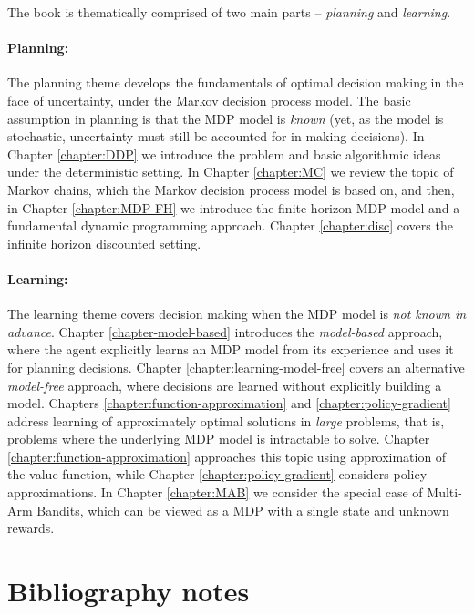 The book is thematically comprised of two main parts -- \textit{planning} and \textit{learning}. 

\paragraph{Planning:} The planning theme develops the fundamentals of optimal decision making in the face of uncertainty, under the Markov decision process model. The basic assumption in planning is that the MDP model is \textit{known} (yet, as the model is stochastic, uncertainty must still be accounted for in making decisions).
In Chapter \ref{chapter:DDP} we introduce the problem and basic algorithmic ideas under the deterministic setting. In Chapter \ref{chapter:MC} we review the topic of Markov chains, which the Markov decision process model is based on, and
then, in Chapter \ref{chapter:MDP-FH} we introduce the finite horizon MDP model and a fundamental dynamic programming approach. Chapter \ref{chapter:disc} covers the infinite horizon discounted setting.

\paragraph{Learning:} The learning theme covers decision making when the MDP model is \textit{not known in advance}. Chapter \ref{chapter-model-based} introduces the \textit{model-based} approach, where the agent explicitly learns an MDP model from its experience and uses it for planning decisions. Chapter \ref{chapter:learning-model-free} covers an alternative \textit{model-free} approach, where decisions are learned without explicitly building a model. Chapters \ref{chapter:function-approximation} and \ref{chapter:policy-gradient} address learning of approximately optimal solutions in \textit{large} problems, that is, problems where the underlying MDP model is intractable to solve. Chapter \ref{chapter:function-approximation} approaches this topic using approximation of the value function, while Chapter \ref{chapter:policy-gradient} considers policy approximations. In Chapter \ref{chapter:MAB} we consider the special case of Multi-Arm Bandits, which can be viewed as a MDP with a single state and unknown rewards. 

\section{Bibliography notes}

